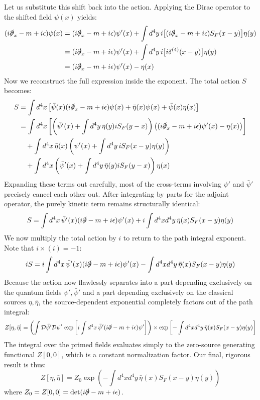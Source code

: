 Let us substitute this shift back into the action. Applying the Dirac operator to the shifted field $\psi(x)$ yields:
\[
    \begin{aligned}
        (i\slashed{\partial}_x - m + i\epsilon)\psi(x) & = (i\slashed{\partial}_x - m + i\epsilon)\psi'(x) + \int d^4y \, i \big[ (i\slashed{\partial}_x - m + i\epsilon) S_F(x-y) \big] \eta(y) \\
                                                       & = (i\slashed{\partial}_x - m + i\epsilon)\psi'(x) + \int d^4y \, i \big[ i\delta^{(4)}(x-y) \big] \eta(y)                               \\
                                                       & = (i\slashed{\partial}_x - m + i\epsilon)\psi'(x) - \eta(x)
    \end{aligned}
\]
Now we reconstruct the full expression inside the exponent. The total action $S$ becomes:
\[
    \begin{aligned}
        S & = \int d^4x \left[ \bar{\psi}(x) (i\slashed{\partial}_x - m + i\epsilon) \psi(x) + \bar{\eta}(x)\psi(x) + \bar{\psi}(x)\eta(x) \right]                                 \\
          & = \int d^4x \left[ \left( \bar{\psi}'(x) + \int d^4y \, \bar{\eta}(y) i S_F(y-x) \right) \big( (i\slashed{\partial}_x - m + i\epsilon)\psi'(x) - \eta(x) \big) \right] \\
          & \quad + \int d^4x \, \bar{\eta}(x) \left( \psi'(x) + \int d^4y \, i S_F(x-y) \eta(y) \right)                                                                           \\
          & \quad + \int d^4x \left( \bar{\psi}'(x) + \int d^4y \, \bar{\eta}(y) i S_F(y-x) \right) \eta(x)
    \end{aligned}
\]
Expanding these terms out carefully, most of the cross-terms involving $\psi'$ and $\bar{\psi}'$ precisely cancel each other out. After integrating by parts for the adjoint operator, the purely kinetic term remains structurally identical:
\[
    S = \int d^4x \, \bar{\psi}'(x)(i\slashed{\partial} - m + i\epsilon)\psi'(x) + i \int d^4x d^4y \, \bar{\eta}(x) S_F(x-y) \eta(y)
\]
We now multiply the total action by $i$ to return to the path integral exponent. Note that $i \times (i) = -1$:
\[
    iS = i \int d^4x \, \bar{\psi}'(x)(i\slashed{\partial} - m + i\epsilon)\psi'(x) - \int d^4x d^4y \, \bar{\eta}(x) S_F(x-y) \eta(y)
\]
Because the action now flawlessly separates into a part depending exclusively on the quantum fields $\psi', \bar{\psi}'$ and a part depending exclusively on the classical sources $\eta, \bar{\eta}$, the source-dependent exponential completely factors out of the path integral:
\[
    Z[\eta, \bar{\eta}] = \left( \int \mathcal{D}\bar{\psi}' \mathcal{D}\psi' \, \exp\left[ i \int d^4x \, \bar{\psi}'(i\slashed{\partial} - m + i\epsilon)\psi' \right] \right) \times \exp\left[ - \int d^4x d^4y \, \bar{\eta}(x) S_F(x-y) \eta(y) \right]
\]
The integral over the primed fields evaluates simply to the zero-source generating functional $Z[0,0]$, which is a constant normalization factor. Our final, rigorous result is thus:
\[
    Z[\eta, \bar{\eta}] = Z_0 \exp\left( - \int d^4x d^4y \, \bar{\eta}(x) S_F(x-y) \eta(y) \right)
\]
where $Z_0 = Z[0,0] = \det(i\slashed{\partial} - m + i\epsilon)$.


